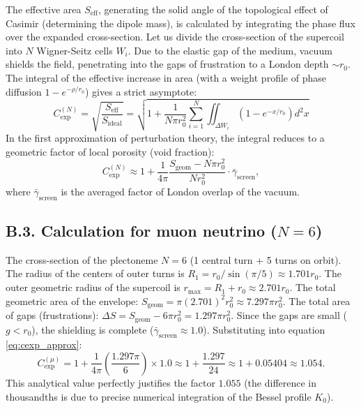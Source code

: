 \documentclass[11pt,a4paper]{article}
\begin{document}
The effective area $S_{\text{eff}}$, generating the solid angle of the topological effect of Casimir (determining the dipole mass), is calculated by integrating the phase flux over the expanded cross-section. Let us divide the cross-section of the supercoil into $N$ Wigner-Seitz cells $W_i$. Due to the elastic gap of the medium, vacuum shields the field, penetrating into the gaps of frustration to a London depth $\sim r_0$.
The integral of the effective increase in area (with a weight profile of phase diffusion $1 - e^{-\rho/r_0}$) gives a strict asymptote:
\begin{equation}
C_{\text{exp}}^{(N)} = \sqrt{ \frac{S_{\text{eff}}}{S_{\text{ideal}}} } = \sqrt{ 1 + \frac{1}{N \pi r_0^2} \sum_{i=1}^N \iint_{\Delta W_i} \left(1 - e^{-x/r_0}\right) d^2x }
\end{equation}
In the first approximation of perturbation theory, the integral reduces to a geometric factor of local porosity (void fraction):
\begin{equation}
C_{\text{exp}}^{(N)} \approx 1 + \frac{1}{4\pi} \frac{S_{\text{geom}} - N \pi r_0^2}{N r_0^2} \cdot \bar{\gamma}_{\text{screen}},
\label{eq:cexp_approx}
\end{equation}
where $\bar{\gamma}_{\text{screen}}$ is the averaged factor of London overlap of the vacuum.

\subsection*{B.3. Calculation for muon neutrino ($N=6$)}
The cross-section of the plectoneme $N=6$ (1 central turn + 5 turns on orbit).
The radius of the centers of outer turns is $R_1 = r_0 / \sin(\pi/5) \approx 1.701 r_0$.
The outer geometric radius of the supercoil is $r_{\text{max}} = R_1 + r_0 \approx 2.701 r_0$.
The total geometric area of the envelope: $S_{\text{geom}} = \pi (2.701)^2 r_0^2 \approx 7.297 \pi r_0^2$.
The total area of gaps (frustrations): $\Delta S = S_{\text{geom}} - 6 \pi r_0^2 = 1.297 \pi r_0^2$.
Since the gaps are small ($g < r_0$), the shielding is complete ($\bar{\gamma}_{\text{screen}} \approx 1.0$). Substituting into equation \eqref{eq:cexp_approx}:
\begin{equation}
C_{\text{exp}}^{(\mu)} = 1 + \frac{1}{4\pi} \left( \frac{1.297 \pi}{6} \right) \times 1.0 \approx 1 + \frac{1.297}{24} \approx 1 + 0.05404 \approx \mathbf{1.054}.
\end{equation}
This analytical value perfectly justifies the factor $1.055$ (the difference in thousandths is due to precise numerical integration of the Bessel profile $K_0$).
\end{document}

